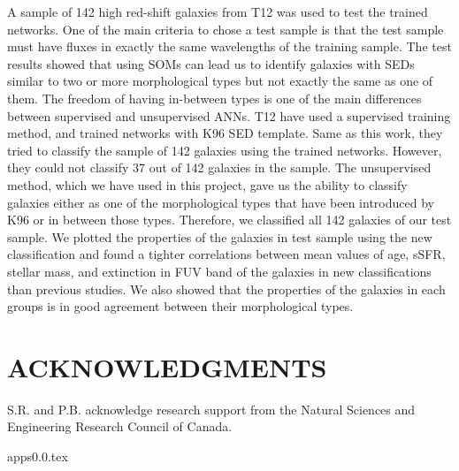 \documentclass[useAMS,usenatbib]{mn2e}
\begin{document}
A sample of 142 high red-shift galaxies from T12 was used to test the trained networks.
One of the main criteria to chose a test sample is that the test sample must have fluxes in exactly the same wavelengths of the training sample.
The test results showed that using SOMs can lead us to identify galaxies with SEDs similar to two or more morphological types but not exactly the same as one of them.
The freedom of having in-between types is one of the main differences between supervised and unsupervised ANNs.
T12 have used a supervised training method, and trained networks with K96 SED template.
Same as this work, they tried to classify the sample of 142 galaxies using the trained networks.
However, they could not classify 37 out of 142 galaxies in the sample.
The unsupervised method, which we have used in this project, gave us the ability to classify galaxies either as one of the morphological types that have been introduced by K96 or in between those types. 
Therefore, we classified all 142 galaxies of our test sample.
We plotted the properties of the galaxies in test sample using the new classification and found a tighter correlations between mean values of age, sSFR, stellar mass, and extinction in FUV band of the galaxies in new classifications than previous studies.
We also showed that the properties of the galaxies in each groups is in good agreement between their morphological types.

\section*{ACKNOWLEDGMENTS}
S.R. and P.B. acknowledge research support from the Natural Sciences and Engineering Research Council of Canada. 



{apps0.0.tex}
\end{document}
